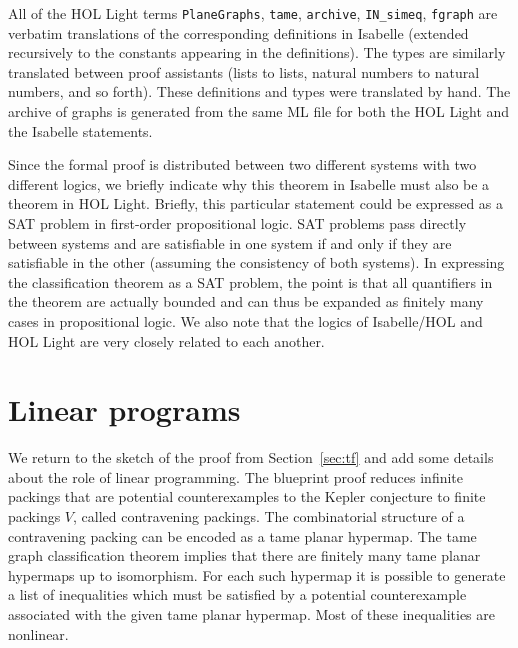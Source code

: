 All of the HOL Light terms
\verb!PlaneGraphs!, \verb!tame!, \verb!archive!, \verb!IN_simeq!,
\verb!fgraph! are verbatim translations of the corresponding
definitions in Isabelle (extended recursively to the constants
appearing in the definitions).  The types are similarly translated
between proof assistants (lists to lists, natural numbers to natural
numbers, and so forth).  These definitions and types were translated
by hand.  The archive of graphs is generated from the same ML file for
both the HOL Light and the Isabelle statements.

Since the formal proof is distributed between two different systems
with two different logics, we briefly indicate why this theorem in
Isabelle must also be a theorem in HOL Light.  Briefly, this
particular statement could be expressed as a SAT problem in
first-order propositional logic.  SAT problems pass directly between
systems and are satisfiable in one system if and only if they are
satisfiable in the other (assuming the consistency of both systems).
In expressing the classification theorem as a SAT problem, the point
is that all quantifiers in the theorem are actually bounded and can
thus be expanded as finitely many cases in propositional logic.  We
also note that the logics of Isabelle/HOL and HOL Light are very
closely related to each another.

\section{Linear programs}\label{sec:lp}

We return to the sketch of the proof from Section~\ref{sec:tf} and add
some details about the role of linear programming.  The blueprint
proof reduces infinite packings that are potential counterexamples to
the Kepler conjecture to finite packings $V$, called contravening
packings. The combinatorial structure of a contravening packing can be
encoded as a tame planar hypermap. The tame graph classification
theorem implies that there are finitely many tame planar hypermaps up
to isomorphism. For each such hypermap it is possible to generate a
list of inequalities which must be satisfied by a potential
counterexample associated with the given tame planar hypermap. Most of
these inequalities are nonlinear.

